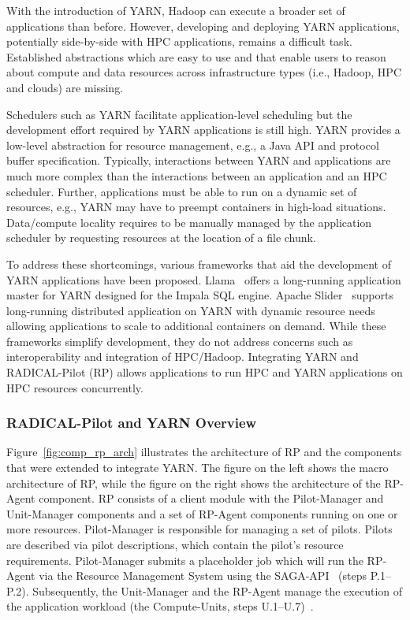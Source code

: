 With the introduction of YARN, Hadoop can execute a broader set of applications
than before. However, developing and deploying YARN
applications, potentially side-by-side with HPC applications, remains a
difficult task. Established abstractions which are easy to use and that enable
users to reason about compute and data resources across infrastructure types
(i.e., Hadoop, HPC and clouds) are missing.

Schedulers such as YARN facilitate application-level scheduling but the
development effort required by YARN applications is still high. YARN provides a
low-level abstraction for resource management, e.g., a Java API and protocol
buffer specification. Typically, interactions between YARN and applications are
much more complex than the interactions between an application and an HPC
scheduler. Further, applications must be able to run on a dynamic set of
resources, e.g., YARN may have to preempt containers in high-load situations.
Data/compute locality requires to be manually managed by the application scheduler
by requesting resources at the location of a file chunk.

To address these shortcomings, various frameworks that aid the development of
YARN applications have been proposed. Llama~\cite{llama} offers a long-running
application master for YARN designed for the Impala SQL engine. Apache
Slider~\cite{apache-slider} supports long-running distributed application on
YARN with dynamic resource needs allowing applications to scale to additional
containers on demand. While these frameworks simplify development, they do not
address concerns such as interoperability and integration of HPC/Hadoop.
Integrating YARN and RADICAL-Pilot (RP) allows applications to run HPC and YARN
applications on HPC resources concurrently.

\subsubsection*{RADICAL-Pilot and YARN Overview}
\label{sssec:rp_yarn}

Figure~\ref{fig:comp_rp_arch} illustrates the architecture of RP and
the components that were extended to integrate YARN. The figure on the left
shows the macro architecture of RP, while the figure on the right
shows the architecture of the RP-Agent component. RP
consists of a client module with the Pilot-Manager and Unit-Manager components
and a set of RP-Agent components running on one or more resources.
Pilot-Manager is responsible for managing a set of pilots. Pilots are described
via pilot descriptions, which contain the pilot's resource requirements.
Pilot-Manager submits a placeholder job which will run the RP-Agent
via the Resource Management System using the SAGA-API~\cite{merzky2015saga}
(steps P.1--P.2). Subsequently, the Unit-Manager and the RP-Agent
manage the execution of the application workload (the Compute-Units, steps
U.1--U.7)~\cite{merzky2019using}.

